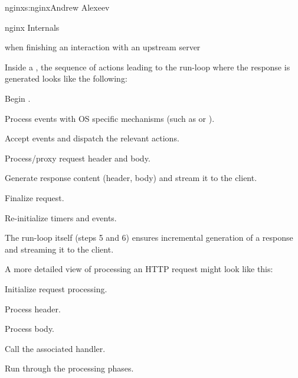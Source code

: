 \begin{aosachapter}{nginx}{s:nginx}{Andrew Alexeev}
\begin{aosasect1}{nginx Internals}
\begin{aosaitemize}
\item when finishing an interaction with an upstream server

\end{aosaitemize}

Inside a , the sequence of actions leading to the
run-loop where the response is generated looks like the following:

\begin{aosaenumerate}

\item Begin .

\item Process events with OS specific mechanisms (such as 
  or ).

\item Accept events and dispatch the relevant actions.

\item Process/proxy request header and body.

\item Generate response content (header, body) and stream it to the
  client.

\item Finalize request.

\item Re-initialize timers and events.

\end{aosaenumerate}

The run-loop itself (steps 5 and 6) ensures incremental generation of
a response and streaming it to the client.


A more detailed view of processing an HTTP request might look like
this:

\begin{aosaenumerate}

\item Initialize request processing.

\item Process header.

\item Process body.

\item Call the associated handler.

\item Run through the processing phases.

\end{aosaenumerate}


\end{aosasect1}
\end{aosachapter}
